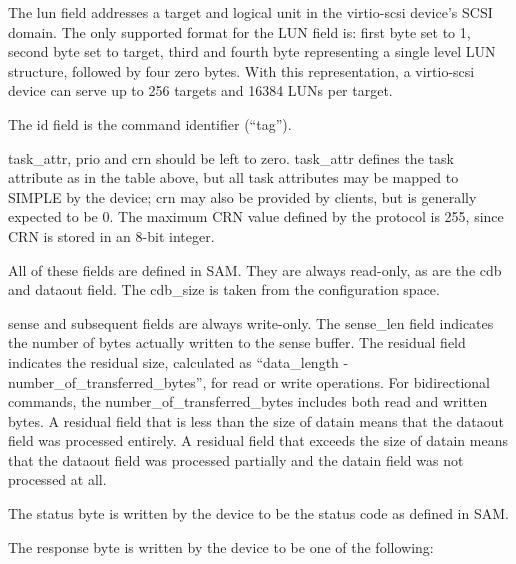 The lun field addresses a target and logical unit in the
virtio-scsi device's SCSI domain. The only supported format for
the LUN field is: first byte set to 1, second byte set to target,
third and fourth byte representing a single level LUN structure,
followed by four zero bytes. With this representation, a
virtio-scsi device can serve up to 256 targets and 16384 LUNs per
target.

The id field is the command identifier (“tag”).

task_attr, prio and crn should be left to zero. task_attr defines
the task attribute as in the table above, but all task attributes
may be mapped to SIMPLE by the device; crn may also be provided
by clients, but is generally expected to be 0. The maximum CRN
value defined by the protocol is 255, since CRN is stored in an
8-bit integer.

All of these fields are defined in SAM. They are always
read-only, as are the cdb and dataout field. The cdb_size is
taken from the configuration space.

sense and subsequent fields are always write-only. The sense_len
field indicates the number of bytes actually written to the sense
buffer. The residual field indicates the residual size,
calculated as “data_length - number_of_transferred_bytes”, for
read or write operations. For bidirectional commands, the
number_of_transferred_bytes includes both read and written bytes.
A residual field that is less than the size of datain means that
the dataout field was processed entirely. A residual field that
exceeds the size of datain means that the dataout field was
processed partially and the datain field was not processed at
all.

The status byte is written by the device to be the status code as
defined in SAM.

The response byte is written by the device to be one of the
following:

